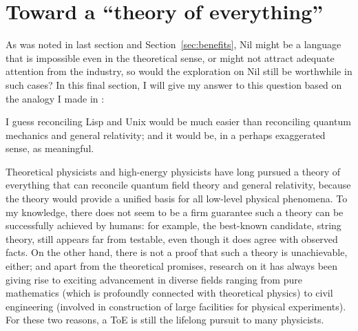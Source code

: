 \section{Toward a ``theory of everything''}\label{sec:toe}

As was noted in last section and Section~\ref{sec:benefits}, Nil might be a
language that is impossible even in the theoretical sense, or might not attract
adequate attention from the industry, so would the exploration on Nil still be
worthwhile in such cases?  In this final section, I will give my answer
to this question based on the analogy I made in \parencite{vector2018c}:
\begin{quoting}
	I guess reconciling Lisp and Unix would be much easier than
	reconciling quantum mechanics and general relativity; and
	it would be, in a perhaps exaggerated sense, as meaningful.
\end{quoting}

Theoretical physicists and high-energy physicists have long pursued a theory
of everything that can reconcile quantum field theory and general relativity,
because the theory would provide a unified basis for all low-level physical
phenomena.  To my knowledge, there does not seem to be a firm guarantee such
a theory can be successfully achieved by humans: for example, the best-known
candidate, string theory, still appears far from testable, even though it does
agree with observed facts.  On the other hand, there is not a proof that such
a theory is unachievable, either; and apart from the theoretical promises,
research on it has always been giving rise to exciting advancement in diverse
fields ranging from pure mathematics (which is profoundly connected with
theoretical physics) to civil engineering (involved in construction of
large facilities for physical experiments).  For these two reasons,
a ToE is still the lifelong pursuit to many physicists.

